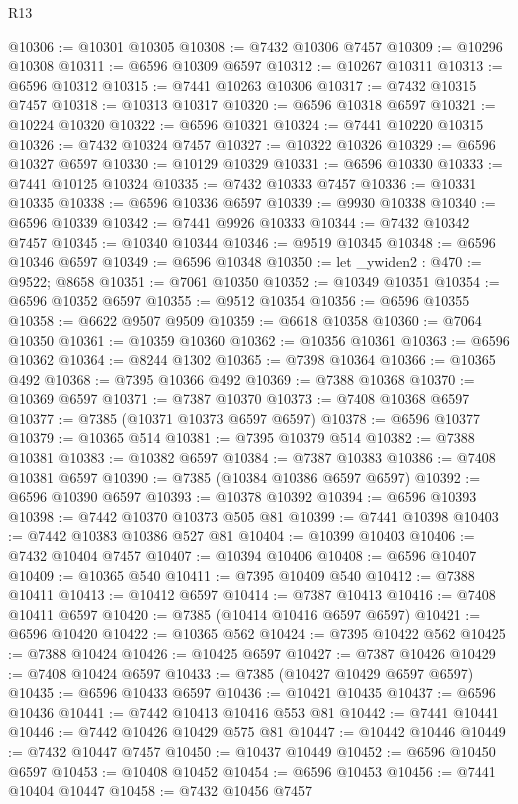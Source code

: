 \begin{lexlean}{R13}
\begin{coremodule}
@10306 := @10301 @10305
@10308 := @7432 @10306 @7457
@10309 := @10296 @10308
@10311 := @6596 @10309 @6597
@10312 := @10267 @10311
@10313 := @6596 @10312
@10315 := @7441 @10263 @10306
@10317 := @7432 @10315 @7457
@10318 := @10313 @10317
@10320 := @6596 @10318 @6597
@10321 := @10224 @10320
@10322 := @6596 @10321
@10324 := @7441 @10220 @10315
@10326 := @7432 @10324 @7457
@10327 := @10322 @10326
@10329 := @6596 @10327 @6597
@10330 := @10129 @10329
@10331 := @6596 @10330
@10333 := @7441 @10125 @10324
@10335 := @7432 @10333 @7457
@10336 := @10331 @10335
@10338 := @6596 @10336 @6597
@10339 := @9930 @10338
@10340 := @6596 @10339
@10342 := @7441 @9926 @10333
@10344 := @7432 @10342 @7457
@10345 := @10340 @10344
@10346 := @9519 @10345
@10348 := @6596 @10346 @6597
@10349 := @6596 @10348
@10350 := let _ywiden2 : @470 := @9522; @8658
@10351 := @7061 @10350
@10352 := @10349 @10351
@10354 := @6596 @10352 @6597
@10355 := @9512 @10354
@10356 := @6596 @10355
@10358 := @6622 @9507 @9509
@10359 := @6618 @10358
@10360 := @7064 @10350
@10361 := @10359 @10360
@10362 := @10356 @10361
@10363 := @6596 @10362
@10364 := @8244 @1302
@10365 := @7398 @10364
@10366 := @10365 @492
@10368 := @7395 @10366 @492
@10369 := @7388 @10368
@10370 := @10369 @6597
@10371 := @7387 @10370
@10373 := @7408 @10368 @6597
@10377 := @7385 (@10371 @10373 @6597 @6597)
@10378 := @6596 @10377
@10379 := @10365 @514
@10381 := @7395 @10379 @514
@10382 := @7388 @10381
@10383 := @10382 @6597
@10384 := @7387 @10383
@10386 := @7408 @10381 @6597
@10390 := @7385 (@10384 @10386 @6597 @6597)
@10392 := @6596 @10390 @6597
@10393 := @10378 @10392
@10394 := @6596 @10393
@10398 := @7442 @10370 @10373 @505 @81
@10399 := @7441 @10398
@10403 := @7442 @10383 @10386 @527 @81
@10404 := @10399 @10403
@10406 := @7432 @10404 @7457
@10407 := @10394 @10406
@10408 := @6596 @10407
@10409 := @10365 @540
@10411 := @7395 @10409 @540
@10412 := @7388 @10411
@10413 := @10412 @6597
@10414 := @7387 @10413
@10416 := @7408 @10411 @6597
@10420 := @7385 (@10414 @10416 @6597 @6597)
@10421 := @6596 @10420
@10422 := @10365 @562
@10424 := @7395 @10422 @562
@10425 := @7388 @10424
@10426 := @10425 @6597
@10427 := @7387 @10426
@10429 := @7408 @10424 @6597
@10433 := @7385 (@10427 @10429 @6597 @6597)
@10435 := @6596 @10433 @6597
@10436 := @10421 @10435
@10437 := @6596 @10436
@10441 := @7442 @10413 @10416 @553 @81
@10442 := @7441 @10441
@10446 := @7442 @10426 @10429 @575 @81
@10447 := @10442 @10446
@10449 := @7432 @10447 @7457
@10450 := @10437 @10449
@10452 := @6596 @10450 @6597
@10453 := @10408 @10452
@10454 := @6596 @10453
@10456 := @7441 @10404 @10447
@10458 := @7432 @10456 @7457

\end{coremodule}
\end{lexlean}
